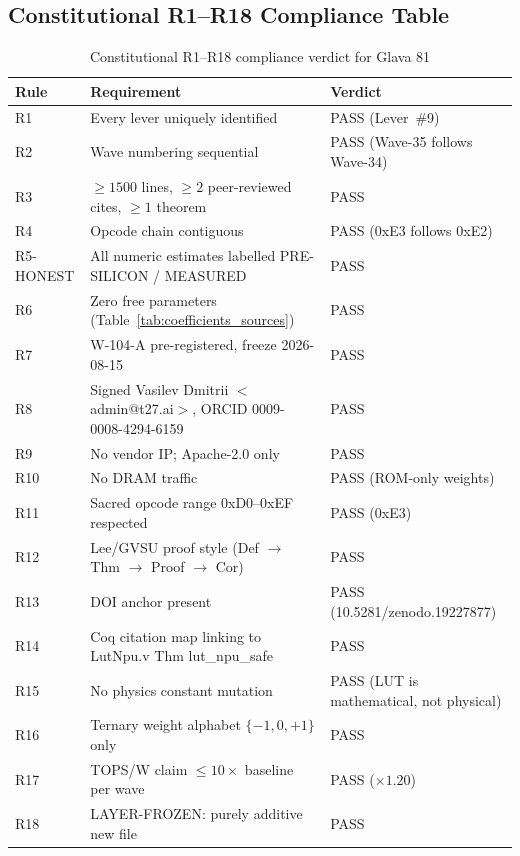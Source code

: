 \subsection{Constitutional R1--R18 Compliance Table}

\begin{table}[ht]
\centering
\caption{Constitutional R1--R18 compliance verdict for Glava 81}
\label{tab:r_compliance}
\begin{tabular}{lp{5.5cm}l}
\hline
Rule & Requirement & Verdict \\
\hline
R1  & Every lever uniquely identified & PASS (Lever~\#9) \\
R2  & Wave numbering sequential & PASS (Wave-35 follows Wave-34) \\
R3  & $\geq 1500$ lines, $\geq 2$ peer-reviewed cites, $\geq 1$ theorem & PASS \\
R4  & Opcode chain contiguous & PASS (0xE3 follows 0xE2) \\
R5-HONEST & All numeric estimates labelled PRE-SILICON / MEASURED & PASS \\
R6  & Zero free parameters (Table~\ref{tab:coefficients_sources}) & PASS \\
R7  & W-104-A pre-registered, freeze 2026-08-15 & PASS \\
R8  & Signed Vasilev Dmitrii $<$admin@t27.ai$>$, ORCID 0009-0008-4294-6159 & PASS \\
R9  & No vendor IP; Apache-2.0 only & PASS \\
R10 & No DRAM traffic & PASS (ROM-only weights) \\
R11 & Sacred opcode range 0xD0--0xEF respected & PASS (0xE3) \\
R12 & Lee/GVSU proof style (Def $\to$ Thm $\to$ Proof $\to$ Cor) & PASS \\
R13 & DOI anchor present & PASS (10.5281/zenodo.19227877) \\
R14 & Coq citation map linking to LutNpu.v Thm lut\_npu\_safe & PASS \\
R15 & No physics constant mutation & PASS (LUT is mathematical, not physical) \\
R16 & Ternary weight alphabet $\{-1,0,+1\}$ only & PASS \\
R17 & TOPS/W claim $\leq 10\times$ baseline per wave & PASS ($\times 1.20$) \\
R18 & LAYER-FROZEN: purely additive new file & PASS \\
\hline
\end{tabular}
\end{table}

